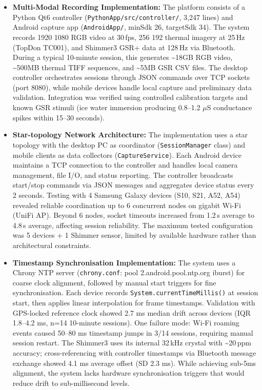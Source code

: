 \begin{itemize}
    \item \textbf{Multi-Modal Recording Implementation:} The platform consists of a Python Qt6 controller (\texttt{PythonApp/src/controller/}, 3{,}247 lines) and Android capture app (\texttt{AndroidApp/}, minSdk 26, targetSdk 34). The system records 1920\,\texttimes\,1080 RGB video at 30\,fps, 256\,\texttimes\,192 thermal imagery at 25\,Hz (TopDon TC001), and Shimmer3 GSR+ data at 128\,Hz via Bluetooth. During a typical 10-minute session, this generates \textasciitilde{}18GB RGB video, \textasciitilde{}500MB thermal TIFF sequences, and \textasciitilde{}5MB GSR CSV files. The desktop controller orchestrates sessions through JSON commands over TCP sockets (port 8080), while mobile devices handle local capture and preliminary data validation. Integration was verified using controlled calibration targets and known GSR stimuli (ice water immersion producing 0.8--1.2 $\mu$S conductance spikes within 15--30 seconds).
    \item \textbf{Star-topology Network Architecture:} The implementation uses a star topology with the desktop PC as coordinator (\texttt{SessionManager} class) and mobile clients as data collectors (\texttt{CaptureService}). Each Android device maintains a TCP connection to the controller and handles local camera management, file I/O, and status reporting. The controller broadcasts start/stop commands via JSON messages and aggregates device status every 2 seconds. Testing with 4 Samsung Galaxy devices (S10, S21, A52, A54) revealed reliable coordination up to 6 concurrent nodes on gigabit Wi-Fi (UniFi AP). Beyond 6 nodes, socket timeouts increased from 1.2\,s average to 4.8\,s average, affecting session reliability. The maximum tested configuration was 5 devices + 1 Shimmer sensor, limited by available hardware rather than architectural constraints.
    \item \textbf{Timestamp Synchronisation Implementation:} The system uses a Chrony NTP server (\texttt{chrony.conf}: pool 2.android.pool.ntp.org iburst) for coarse clock alignment, followed by manual start triggers for fine synchronisation. Each device records \texttt{System.currentTimeMillis()} at session start, then applies linear interpolation for frame timestamps. Validation with GPS-locked reference clock showed 2.7 ms median drift across devices (IQR 1.8--4.2 ms, n=14 10-minute sessions). One failure mode: Wi-Fi roaming events caused 50--80 ms timestamp jumps in 3/14 sessions, requiring manual session restart. The Shimmer3 uses its internal 32\,kHz crystal with \textasciitilde{}\textpm{}20\,ppm accuracy; cross-referencing with controller timestamps via Bluetooth message exchange showed 4.1 ms average offset (SD 2.3 ms). While achieving sub-5ms alignment, the system lacks hardware synchronisation triggers that would reduce drift to sub-millisecond levels.

\end{itemize}
